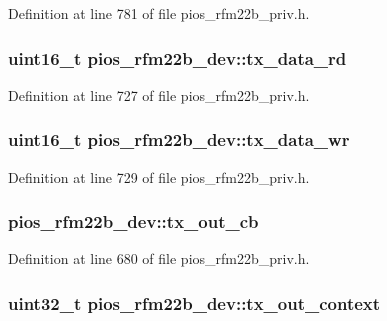 \-Definition at line 781 of file pios\-\_\-rfm22b\-\_\-priv.\-h.

\hypertarget{structpios__rfm22b__dev_a19f0507e484216186dab475d3d5f15a0}{
\subsubsection[{tx\-\_\-data\-\_\-rd}]{\setlength{\rightskip}{0pt plus 5cm}uint16\-\_\-t {\bf pios\-\_\-rfm22b\-\_\-dev\-::tx\-\_\-data\-\_\-rd}}}\label{structpios__rfm22b__dev_a19f0507e484216186dab475d3d5f15a0}


\-Definition at line 727 of file pios\-\_\-rfm22b\-\_\-priv.\-h.

\hypertarget{structpios__rfm22b__dev_a6fa47c8dff475d9292a547732cbe4138}{
\subsubsection[{tx\-\_\-data\-\_\-wr}]{\setlength{\rightskip}{0pt plus 5cm}uint16\-\_\-t {\bf pios\-\_\-rfm22b\-\_\-dev\-::tx\-\_\-data\-\_\-wr}}}\label{structpios__rfm22b__dev_a6fa47c8dff475d9292a547732cbe4138}


\-Definition at line 729 of file pios\-\_\-rfm22b\-\_\-priv.\-h.

\hypertarget{structpios__rfm22b__dev_ab861d6c14abc749f20e45226bd606840}{
\subsubsection[{tx\-\_\-out\-\_\-cb}]{ {\bf pios\-\_\-rfm22b\-\_\-dev\-::tx\-\_\-out\-\_\-cb}}}\label{structpios__rfm22b__dev_ab861d6c14abc749f20e45226bd606840}


\-Definition at line 680 of file pios\-\_\-rfm22b\-\_\-priv.\-h.

\hypertarget{structpios__rfm22b__dev_a6d55d5cf2cee09fb6e56c1f918dc31ea}{
\subsubsection[{tx\-\_\-out\-\_\-context}]{\setlength{\rightskip}{0pt plus 5cm}uint32\-\_\-t {\bf pios\-\_\-rfm22b\-\_\-dev\-::tx\-\_\-out\-\_\-context}}}\label{structpios__rfm22b__dev_a6d55d5cf2cee09fb6e56c1f918dc31ea}


